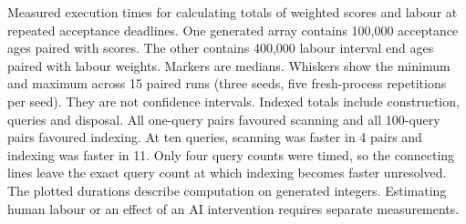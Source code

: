 Measured execution times for calculating totals of weighted scores and labour at repeated acceptance deadlines. One generated array contains 100,000 acceptance ages paired with scores. The other contains 400,000 labour interval end ages paired with labour weights. Markers are medians. Whiskers show the minimum and maximum across 15 paired runs (three seeds, five fresh-process repetitions per seed). They are not confidence intervals. Indexed totals include construction, queries and disposal. All one-query pairs favoured scanning and all 100-query pairs favoured indexing. At ten queries, scanning was faster in 4 pairs and indexing was faster in 11. Only four query counts were timed, so the connecting lines leave the exact query count at which indexing becomes faster unresolved. The plotted durations describe computation on generated integers. Estimating human labour or an effect of an AI intervention requires separate measurements.
